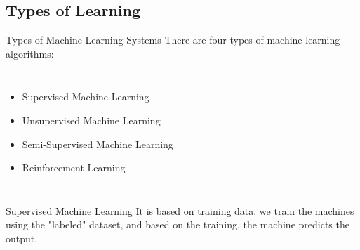 \documentclass{beamer}
\begin{document}
    \subsection{Types of Learning}
    \begin{frame}[label=lists]{Types of Machine Learning Systems}
      There are four types of machine learning algorithms:
      \newline
      \begin{columns}[onlytextwidth]
          \begin{itemize}
            \item Supervised Machine Learning
            \item Unsupervised Machine Learning
            \item Semi-Supervised Machine Learning
            \item Reinforcement Learning
            \end{itemize}
      \end{columns}
      
    \end{frame} 
    
    \begin{frame}[t]{Supervised Machine Learning}
      \justifying It is based on training data. we train the machines using the "labeled" dataset, and based on the training, the machine predicts the output. 
    
    \end{frame}
    
\end{document}
